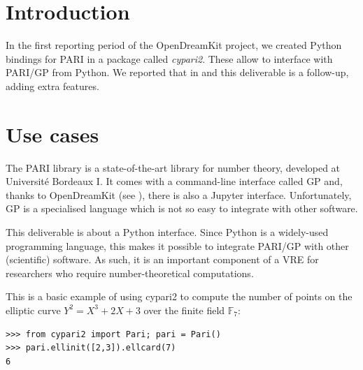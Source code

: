 \documentclass{deliverablereport}
\author{Jeroen Demeyer}
\begin{document}
\maketitle
\tableofcontents


\section{Introduction}



In the first reporting period of the OpenDreamKit project,
we created Python bindings for PARI in a package called \emph{cypari2}.
These allow to interface with PARI/GP from Python.
We reported that in  and this deliverable is a follow-up,
adding extra features.

\section{Use cases}

The PARI library is a state-of-the-art library for number theory,
developed at Universit\'e Bordeaux I.
It comes with a command-line interface called GP
and, thanks to OpenDreamKit (see ),
there is also a Jupyter interface.
Unfortunately, GP is a specialised language which is not so easy
to integrate with other software.

This deliverable is about a Python interface.
Since Python is a widely-used programming language,
this makes it possible to integrate PARI/GP with other (scientific) software.
As such, it is an important component of a VRE
for researchers who require number-theoretical computations.

This is a basic example of using cypari2 to compute
the number of points on the elliptic curve $Y^2 = X^3 + 2X + 3$
over the finite field $\mathbb{F}_7$:
\begin{verbatim}
>>> from cypari2 import Pari; pari = Pari()
>>> pari.ellinit([2,3]).ellcard(7)
6
\end{verbatim}
\end{document}
